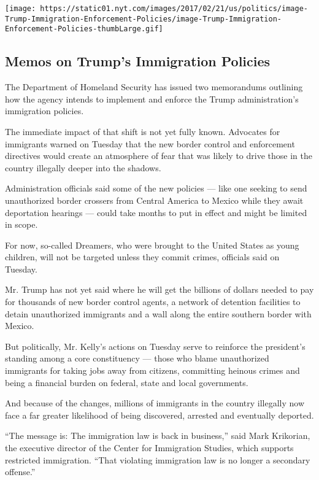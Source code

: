 \href{https://www.nytimes.com/interactive/2017/02/21/us/politics/document-Trump-Immigration-Enforcement-Policies.html}{}

\texttt{[image: https://static01.nyt.com/images/2017/02/21/us/politics/image-Trump-Immigration-Enforcement-Policies/image-Trump-Immigration-Enforcement-Policies-thumbLarge.gif]}

\hypertarget{memos-on-trumps-immigration-policies}{%
\subsection{Memos on Trump's Immigration
Policies}\label{memos-on-trumps-immigration-policies}}

The Department of Homeland Security has issued two memorandums outlining
how the agency intends to implement and enforce the Trump
administration's immigration policies.

The immediate impact of that shift is not yet fully known. Advocates for
immigrants warned on Tuesday that the new border control and enforcement
directives would create an atmosphere of fear that was likely to drive
those in the country illegally deeper into the shadows.

Administration officials said some of the new policies --- like one
seeking to send unauthorized border crossers from Central America to
Mexico while they await deportation hearings --- could take months to
put in effect and might be limited in scope.

For now, so-called Dreamers, who were brought to the United States as
young children, will not be targeted unless they commit crimes,
officials said on Tuesday.

Mr. Trump has not yet said where he will get the billions of dollars
needed to pay for thousands of new border control agents, a network of
detention facilities to detain unauthorized immigrants and a wall along
the entire southern border with Mexico.

But politically, Mr. Kelly's actions on Tuesday serve to reinforce the
president's standing among a core constituency --- those who blame
unauthorized immigrants for taking jobs away from citizens, committing
heinous crimes and being a financial burden on federal, state and local
governments.

And because of the changes, millions of immigrants in the country
illegally now face a far greater likelihood of being discovered,
arrested and eventually deported.

``The message is: The immigration law is back in business,'' said Mark
Krikorian, the executive director of the Center for Immigration Studies,
which supports restricted immigration. ``That violating immigration law
is no longer a secondary offense.''

